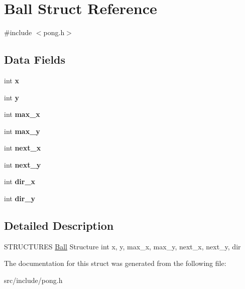 \hypertarget{struct_ball}{}\section{Ball Struct Reference}
\label{struct_ball}


{\ttfamily \#include $<$pong.\+h$>$}

\subsection*{Data Fields}
\begin{DoxyCompactItemize}
\item 
\hypertarget{struct_ball_ab3c19f89a9aff03c2ec82bce4accc85b}{}int {\bfseries x}\label{struct_ball_ab3c19f89a9aff03c2ec82bce4accc85b}

\item 
\hypertarget{struct_ball_a552ae97d1271d89a903359ebe5cc5137}{}int {\bfseries y}\label{struct_ball_a552ae97d1271d89a903359ebe5cc5137}

\item 
\hypertarget{struct_ball_a12ab27b4c43e4b6bea50919edead7017}{}int {\bfseries max\+\_\+x}\label{struct_ball_a12ab27b4c43e4b6bea50919edead7017}

\item 
\hypertarget{struct_ball_a53b193003e30ac3925aca6d5986c463b}{}int {\bfseries max\+\_\+y}\label{struct_ball_a53b193003e30ac3925aca6d5986c463b}

\item 
\hypertarget{struct_ball_a22d300bc2bc4ade6638f2a0db734790d}{}int {\bfseries next\+\_\+x}\label{struct_ball_a22d300bc2bc4ade6638f2a0db734790d}

\item 
\hypertarget{struct_ball_a8a9493b8bcc79f24b75fb8358ad008c9}{}int {\bfseries next\+\_\+y}\label{struct_ball_a8a9493b8bcc79f24b75fb8358ad008c9}

\item 
\hypertarget{struct_ball_a8224187d5be716d31493f28eeb16d784}{}int {\bfseries dir\+\_\+x}\label{struct_ball_a8224187d5be716d31493f28eeb16d784}

\item 
\hypertarget{struct_ball_a17748c25b9585bde66a05fb3a0d0ad9b}{}int {\bfseries dir\+\_\+y}\label{struct_ball_a17748c25b9585bde66a05fb3a0d0ad9b}

\end{DoxyCompactItemize}


\subsection{Detailed Description}
S\+T\+R\+U\+C\+T\+U\+R\+E\+S \hyperlink{struct_ball}{Ball} Structure int x, y, max\+\_\+x, max\+\_\+y, next\+\_\+x, next\+\_\+y, dir 

The documentation for this struct was generated from the following file\+:\begin{DoxyCompactItemize}
\item 
src/include/pong.\+h\end{DoxyCompactItemize}
